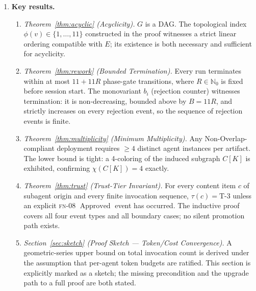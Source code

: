 \documentclass[12pt]{article}
\theoremstyle{definition}
\newcommand{\FN}[1]{\textsc{fn-#1}}
\DeclareMathOperator{\Approved}{Approved}
\begin{document}
\begin{enumerate}
    \item \textbf{Key results.}
    \begin{enumerate}
        \item[(4.1)] \emph{Theorem~\ref{thm:acyclic} (Acyclicity).}
              $G$ is a DAG.
              The topological index $\phi(v) \in \{1,\ldots,11\}$
              constructed in the proof witnesses a strict linear
              ordering compatible with $E$; its existence is both
              necessary and sufficient for acyclicity.
        \item[(4.2)] \emph{Theorem~\ref{thm:rework} (Bounded
              Termination).}
              Every run terminates within at most
              $11 + 11R$ phase-gate transitions, where $R \in
              \mathbb{N}_0$ is fixed before session start.
              The monovariant $b_i$ (rejection counter) witnesses
              termination: it is non-decreasing, bounded above by
              $B = 11R$, and strictly increases on every rejection
              event, so the sequence of rejection events is finite.
        \item[(4.3)] \emph{Theorem~\ref{thm:multiplicity} (Minimum
              Multiplicity).}
              Any Non-Overlap-compliant deployment requires
              $\geq 4$ distinct agent instances per artifact.
              The lower bound is tight: a 4-coloring of the induced
              subgraph $C[K]$ is exhibited, confirming
              $\chi(C[K]) = 4$ exactly.
        \item[(4.4)] \emph{Theorem~\ref{thm:trust} (Trust-Tier
              Invariant).}
              For every content item $c$ of subagent origin and every
              finite invocation sequence, $\tau(c) = \mathrm{T\text{-}3}$
              unless an explicit \FN{08} $\Approved$ event has
              occurred.
              The inductive proof covers all four event types and all
              boundary cases; no silent promotion path exists.
        \item[(4.5)] \emph{Section~\ref{sec:sketch} (Proof Sketch ---
              Token/Cost Convergence).}
              A geometric-series upper bound on total invocation count
              is derived under the assumption that per-agent token
              budgets are ratified.
              This section is explicitly marked as a sketch; the
              missing precondition and the upgrade path to a full
              proof are both stated.
    \end{enumerate}


\end{enumerate}
\end{document}
